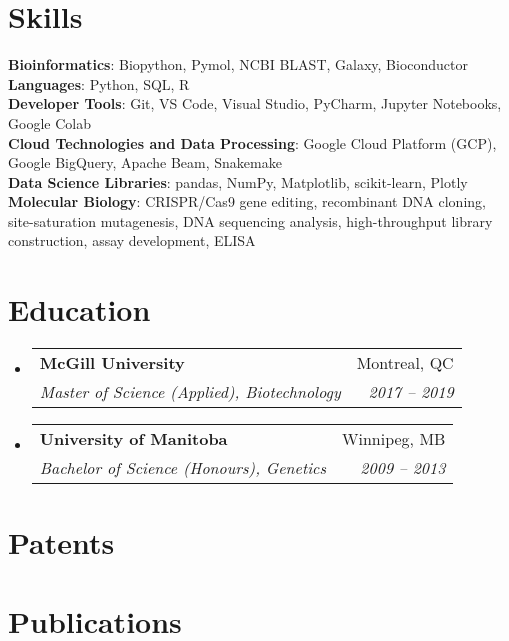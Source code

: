 \documentclass[letterpaper,12pt]{article}
\makeatletter
\newcommand{\resumeSubheading}[4]{
  \vspace{-2pt}\item
    \begin{tabular*}{0.97\textwidth}[t]{l@{\extracolsep{\fill}}r}
      \textbf{#1} & #2 \\
      \textit{\small#3} & \textit{\small #4} \\
    \end{tabular*}\vspace{-7pt}
}
\newcommand{\resumeSubHeadingListStart}{\begin{itemize}[leftmargin=0.15in, label={}]}
\newcommand{\resumeSubHeadingListEnd}{\end{itemize}}
\makeatother
\begin{document}
\section{Skills}
 \begin{itemize}[leftmargin=0.15in, label={}]
	\small
	{\item
	\textbf{Bioinformatics}{: Biopython, Pymol, NCBI BLAST, Galaxy, Bioconductor}\\
	\textbf{Languages}{: Python, SQL, R} \\
     	\textbf{Developer Tools}{: Git, VS Code, Visual Studio, PyCharm, Jupyter Notebooks, Google Colab} \\
	\textbf{Cloud Technologies and Data Processing}{: Google Cloud Platform (GCP), Google BigQuery, Apache Beam, Snakemake}\\
     	\textbf{Data Science Libraries}{: pandas, NumPy, Matplotlib, scikit-learn, Plotly}\\
	\textbf{Molecular Biology}{: CRISPR/Cas9 gene editing, recombinant DNA cloning, site-saturation mutagenesis, DNA sequencing analysis, high-throughput library construction, assay development, ELISA}\\
	}
 \end{itemize}

\section{Education}
  \resumeSubHeadingListStart
    \resumeSubheading
      {McGill University}{Montreal, QC}
      {Master of Science (Applied), Biotechnology}{2017 -- 2019}

    \resumeSubheading
      {University of Manitoba}{Winnipeg, MB}
      {Bachelor of Science (Honours), Genetics}{2009 -- 2013}
  \resumeSubHeadingListEnd

\section{Patents}
\nocite{SONG_CBD,LIAO_OAC}
\printbibliography[heading=none]

\section{Publications}
\begin{refsection}
    \nocite{LY2015114}
    \printbibliography[heading=none]
\end{refsection}
\end{document}
